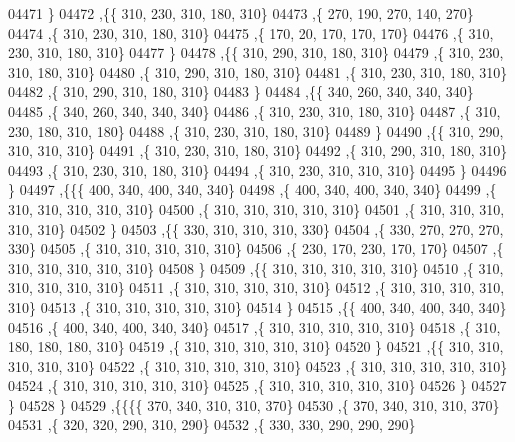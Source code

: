\begin{DoxyCode}
04471     \}
04472    ,\{\{   310,   230,   310,   180,   310\}
04473     ,\{   270,   190,   270,   140,   270\}
04474     ,\{   310,   230,   310,   180,   310\}
04475     ,\{   170,    20,   170,   170,   170\}
04476     ,\{   310,   230,   310,   180,   310\}
04477     \}
04478    ,\{\{   310,   290,   310,   180,   310\}
04479     ,\{   310,   230,   310,   180,   310\}
04480     ,\{   310,   290,   310,   180,   310\}
04481     ,\{   310,   230,   310,   180,   310\}
04482     ,\{   310,   290,   310,   180,   310\}
04483     \}
04484    ,\{\{   340,   260,   340,   340,   340\}
04485     ,\{   340,   260,   340,   340,   340\}
04486     ,\{   310,   230,   310,   180,   310\}
04487     ,\{   310,   230,   180,   310,   180\}
04488     ,\{   310,   230,   310,   180,   310\}
04489     \}
04490    ,\{\{   310,   290,   310,   310,   310\}
04491     ,\{   310,   230,   310,   180,   310\}
04492     ,\{   310,   290,   310,   180,   310\}
04493     ,\{   310,   230,   310,   180,   310\}
04494     ,\{   310,   230,   310,   310,   310\}
04495     \}
04496    \}
04497   ,\{\{\{   400,   340,   400,   340,   340\}
04498     ,\{   400,   340,   400,   340,   340\}
04499     ,\{   310,   310,   310,   310,   310\}
04500     ,\{   310,   310,   310,   310,   310\}
04501     ,\{   310,   310,   310,   310,   310\}
04502     \}
04503    ,\{\{   330,   310,   310,   310,   330\}
04504     ,\{   330,   270,   270,   270,   330\}
04505     ,\{   310,   310,   310,   310,   310\}
04506     ,\{   230,   170,   230,   170,   170\}
04507     ,\{   310,   310,   310,   310,   310\}
04508     \}
04509    ,\{\{   310,   310,   310,   310,   310\}
04510     ,\{   310,   310,   310,   310,   310\}
04511     ,\{   310,   310,   310,   310,   310\}
04512     ,\{   310,   310,   310,   310,   310\}
04513     ,\{   310,   310,   310,   310,   310\}
04514     \}
04515    ,\{\{   400,   340,   400,   340,   340\}
04516     ,\{   400,   340,   400,   340,   340\}
04517     ,\{   310,   310,   310,   310,   310\}
04518     ,\{   310,   180,   180,   180,   310\}
04519     ,\{   310,   310,   310,   310,   310\}
04520     \}
04521    ,\{\{   310,   310,   310,   310,   310\}
04522     ,\{   310,   310,   310,   310,   310\}
04523     ,\{   310,   310,   310,   310,   310\}
04524     ,\{   310,   310,   310,   310,   310\}
04525     ,\{   310,   310,   310,   310,   310\}
04526     \}
04527    \}
04528   \}
04529  ,\{\{\{\{   370,   340,   310,   310,   370\}
04530     ,\{   370,   340,   310,   310,   370\}
04531     ,\{   320,   320,   290,   310,   290\}
04532     ,\{   330,   330,   290,   290,   290\}

\end{DoxyCode}
